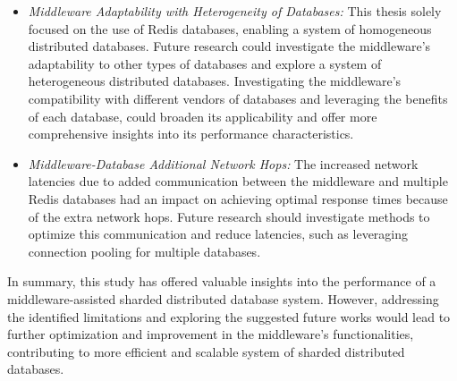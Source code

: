 \begin{itemize}
\item []{\textit{Middleware Adaptability with Heterogeneity of Databases:}} This thesis solely focused on the use of Redis databases, enabling a system of homogeneous distributed databases. Future research could investigate the middleware's adaptability to other types of databases and explore a system of heterogeneous distributed databases. Investigating the middleware's compatibility with different vendors of databases and leveraging the benefits of each database, could broaden its applicability and offer more comprehensive insights into its performance characteristics.

\item []{\textit{Middleware-Database Additional Network Hops:}} The increased network latencies due to added communication between the middleware and multiple Redis databases had an impact on achieving optimal response times because of the extra network hops. Future research should investigate methods to optimize this communication and reduce latencies, such as leveraging connection pooling for multiple databases.
\end{itemize}

\noindent In summary, this study has offered valuable insights into the performance of a middleware-assisted sharded distributed database system. However, addressing the identified limitations and exploring the suggested future works would lead to further optimization and improvement in the middleware’s functionalities, contributing to more efficient and scalable system of sharded distributed databases.

